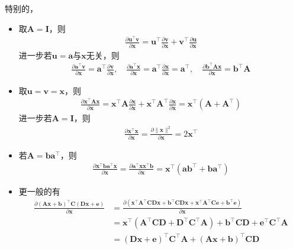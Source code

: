 \documentclass{ctexart}
\theoremstyle{definition}
\def \av {\bm{a}}
\def \bv {\bm{b}}
\def \ev {\bm{e}}
\def \uv {\bm{u}}
\def \vv {\bm{v}}
\def \xv {\bm{x}}
\def \Av {\mathbf{A}}
\def \Cv {\mathbf{C}}
\def \Dv {\mathbf{D}}
\def \Iv {\mathbf{I}}
\begin{document}
特别的，
\begin{itemize}
    \item 取$\Av = \Iv$，则
          \begin{align*}
              \frac{\partial \uv^\top \vv}{\partial \xv} = \uv^\top \frac{\partial \vv}{\partial \xv} + \vv^\top \frac{\partial \uv}{\partial \xv}
          \end{align*}
          进一步若$\uv = \av$与$\xv$无关，则
          \begin{align*}
              \frac{\partial \av^\top \vv}{\partial \xv} = \av^\top \frac{\partial \vv}{\partial \xv}, \quad \frac{\partial \av^\top \xv}{\partial \xv} = \av^\top \frac{\partial \xv}{\partial \xv} = \av^\top, \quad \frac{\partial \bv^\top \Av \xv}{\partial \xv} = \bv^\top \Av
          \end{align*}
    \item 取$\uv = \vv = \xv$，则
          \begin{align*}
              \frac{\partial \xv^\top \Av \xv}{\partial \xv} = \xv^\top \Av \frac{\partial \xv}{\partial \xv} + \xv^\top \Av^\top \frac{\partial \xv}{\partial \xv} = \xv^\top (\Av + \Av^\top)
          \end{align*}
          进一步若$\Av = \Iv$，则
          \begin{align*}
              \frac{\partial \xv^\top \xv}{\partial \xv} = \frac{\partial \|\xv\|^2}{\partial \xv} = 2 \xv^\top
          \end{align*}
    \item 若$\Av = \bv \av^\top$，则
          \begin{align*}
              \frac{\partial \xv^\top \bv \av^\top \xv}{\partial \xv} = \frac{\partial \av^\top \xv \xv^\top \bv}{\partial \xv} = \xv^\top (\av \bv^\top + \bv \av^\top)
          \end{align*}
    \item 更一般的有
          \begin{align*}
              \frac{\partial (\Av \xv + \bv)^\top \Cv (\Dv \xv + \ev)}{\partial \xv} & = \frac{\partial (\xv^\top \Av^\top \Cv \Dv \xv + \bv^\top \Cv \Dv \xv + \xv^\top \Av^\top \Cv \ev + \bv^\top \ev)}{\partial \xv} \\
                                                                                     & = \xv^\top (\Av^\top \Cv \Dv + \Dv^\top \Cv^\top \Av) + \bv^\top \Cv \Dv + \ev^\top \Cv^\top \Av                                  \\
                                                                                     & = (\Dv \xv + \ev)^\top \Cv^\top \Av + (\Av \xv + \bv)^\top \Cv \Dv
          \end{align*}
\end{itemize}
\end{document}
